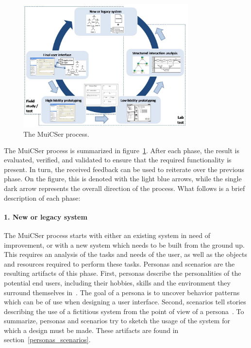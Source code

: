         \begin{figure}[!t]
            \centering
            \includegraphics[width=0.8\textwidth]{chapters/3_design/muicser}
            \caption{The MuiCSer process.}\label{fig:muicser}
        \end{figure}

        The MuiCSer process is summarized in figure~\ref{fig:muicser}. After each phase, the result is evaluated, verified, and validated to ensure that the required functionality is present. In turn, the received feedback can be used to reiterate over the previous phase. On the figure, this is denoted with the light blue arrows, while the single dark arrow represents the overall direction of the process. What follows is a brief description of each phase:

        \paragraph{1. New or legacy system} The MuiCSer process starts with either an existing system in need of improvement, or with a new system which needs to be built from the ground up. This requires an analysis of the tasks and needs of the user, as well as the objects and resources required to perform these tasks. Personas and scenarios are the resulting artifacts of this phase. First, personas describe the personalities of the potential end users, including their hobbies, skills and the environment they surround themselves in~\cite{Madsen2010}. The goal of a persona is to uncover behavior patterns which can be of use when designing a user interface. Second, scenarios tell stories describing the use of a fictitious system from the point of view of a persona~\cite{Madsen2010}. To summarize, personas and scenarios try to sketch the usage of the system for which a design must be made. These artifacts are found in section~\ref{personas_scenarios}.

